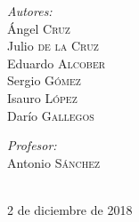 \documentclass[12pt]{article}
\begin{document}
\begin{titlepage}

\begin{minipage}{0.4\textwidth}
\begin{flushleft} \large
\emph{Autores:}\\
Ángel \textsc{Cruz} \\ %
Julio \textsc{de la Cruz} \\
Eduardo \textsc{Alcober}\\
Sergio \textsc{Gómez}\\
Isauro \textsc{López}\\
Darío \textsc{Gallegos}
\end{flushleft}
\end{minipage}
\begin{minipage}{0.4\textwidth}
\begin{flushright} \large
\emph{Profesor:} \\
Antonio \textsc{Sánchez} %
\end{flushright}
\end{minipage}\\[0.66cm]
{\large 2 de diciembre de 2018}\\[0.5cm] %


\vfill %

\end{titlepage}



\tableofcontents %
\newpage

\end{document}

